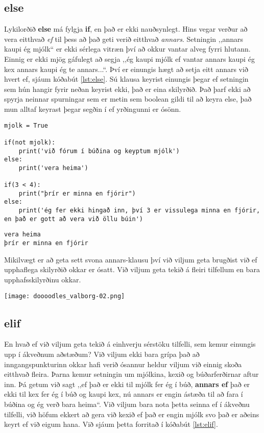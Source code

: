 \subsection{else}
Lykilorðið \textbf{else} má fylgja \textbf{if}, en það er ekki nauðsynlegt.
Hins vegar verður að vera eitthvað \emph{ef} til þess að það geti verið eitthvað \emph{annars}.
Setningin ,,annars kaupi ég mjólk“ er ekki sérlega vitræn því að okkur vantar alveg fyrri hlutann.
Einnig er ekki mjög gáfulegt að segja ,,ég kaupi mjólk ef vantar annars kaupi ég kex annars kaupi ég te annars...“.
Því er einungis hægt að setja eitt annars við hvert ef, sjáum kóðabút \ref{lst:else}.
Sú klausa keyrist einungis þegar ef setningin sem hún hangir fyrir neðan keyrist ekki, það er eina skilyrðið.
Það þarf ekki að spyrja neinnar spurningar sem er metin sem boolean gildi til að keyra else, það mun alltaf keyrast þegar segðin í ef yrðingunni er ósönn.

\newpage

\begin{lstlisting}[caption=else notað, label=lst:else]
mjolk = True

if(not mjolk):
	print('við fórum í búðina og keyptum mjólk')
else:
	print('vera heima')

if(3 < 4):
	print("þrír er minna en fjórir")
else:
	print('ég fer ekki hingað inn, því 3 er vissulega minna en fjórir, en það er gott að vera við öllu búin')
\end{lstlisting}
\lstset{style=uttak}
\begin{lstlisting}
vera heima
þrír er minna en fjórir
\end{lstlisting}
\lstset{style=venjulegt}

Mikilvægt er að geta sett svona annars-klausu því við viljum geta brugðist við ef upphaflega skilyrðið okkar er ósatt.
Við viljum geta tekið á fleiri tilfellum en bara upphafsskilyrðinu okkar.
	\begin{center}
		\texttt{[image: doooodles\_valborg-02.png]}
	\end{center}

\subsection{elif}
En hvað ef við viljum geta tekið á einhverju sérstöku tilfelli, sem kemur einungis upp í ákveðnum aðstæðum?
Við viljum ekki bara grípa það að inngangspunkturinn okkar hafi verið ósannur heldur viljum við einnig skoða eitthvað fleira.
Þarna kemur setningin um mjólkina, kexið og búðarferðirnar aftur inn.
Þá getum við sagt ,,ef það er ekki til mjólk fer ég í búð, \textbf{annars ef} það er ekki til kex fer ég í búð og kaupi kex, nú annars er engin ástæða til að fara í búðina og ég verð bara heima“.
Við viljum bara nota þetta seinna ef í ákveðnu tilfelli, við höfum ekkert að gera við kexið ef það er engin mjólk svo það er aðeins keyrt ef við eigum hana.
Við sjáum þetta forritað í kóðabút \ref{lst:elif}.


